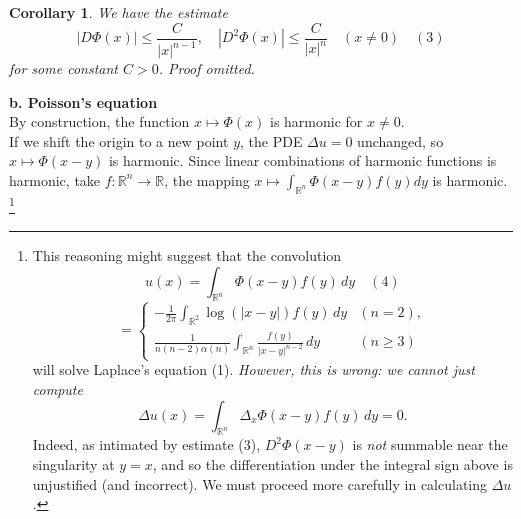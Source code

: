 \documentclass[a4paper,12pt]{report}
\newtheorem{corollary}{Corollary}[section]
\begin{document}
\begin{corollary}
We have the estimate \[
|D\Phi(x)| \leq \frac{C}{|x|^{n-1}}, \quad |D^2\Phi(x)| \leq \frac{C}{|x|^n} \quad (x \neq 0)
 \quad (3)\]
 for some constant \(C > 0\). Proof omitted. 
\end{corollary}
\noindent
\textbf{b. Poisson's equation}\\
By construction, the function \(x \mapsto \Phi (x)\) is harmonic for \(x \neq 0\). \\
If we shift the origin to a new point \(y\), the PDE \(\Delta u = 0\) unchanged, so \(x \mapsto \Phi (x-y)\) is harmonic. Since linear combinations of harmonic functions is harmonic, take \(f: \mathbb{R}^n \to \mathbb{R}\), the mapping \(x \mapsto \int_{\mathbb{R}^n} \Phi (x-y) f(y) dy\) is harmonic. \footnote{This reasoning might suggest that the convolution
\[
u(x) = \int_{\mathbb{R}^n} \Phi(x - y) f(y) \, dy \quad (4)
\]
\[
= 
\begin{cases} 
\displaystyle -\frac{1}{2\pi} \int_{\mathbb{R}^2} \log(|x - y|) f(y) \, dy & (n = 2), \\[1.5em]
\displaystyle \frac{1}{n(n - 2)\alpha(n)} \int_{\mathbb{R}^n} \frac{f(y)}{|x - y|^{n - 2}} \, dy & (n \geq 3)
\end{cases}
\]
will solve Laplace's equation (1). \textit{However, this is wrong: we cannot just compute}
\[
\Delta u(x) = \int_{\mathbb{R}^n} \Delta_x \Phi(x - y) f(y) \, dy = 0.
\]
Indeed, as intimated by estimate (3), $D^2 \Phi(x - y)$ is \textit{not} summable near the singularity at $y = x$, and so the differentiation under the integral sign above is unjustified (and incorrect). We must proceed more carefully in calculating $\Delta u$.}
\end{document}
